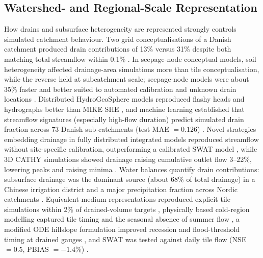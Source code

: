 \documentclass[11pt]{article}
\begin{document}
\subsection{Watershed- and Regional-Scale Representation}

How drains and subsurface heterogeneity are represented strongly controls simulated catchment behaviour. Two grid conceptualisations of a Danish catchment produced drain contributions of 13\% versus 31\% despite both matching total streamflow within 0.1\% \parencite{Karan2021}. In seepage-node conceptual models, soil heterogeneity affected drainage-area simulations more than tile conceptualisation, while the reverse held at subcatchment scale; seepage-node models were about 35\% faster and better suited to automated calibration and unknown drain locations \parencite{Boico2022}. Distributed HydroGeoSphere models reproduced flashy heads and hydrographs better than MIKE SHE \parencite{DeSchepper2017}, and machine learning established that streamflow signatures (especially high-flow duration) predict simulated drain fraction across 73 Danish sub-catchments (test MAE $=0.126$) \parencite{Schneider2022}. Novel strategies embedding drainage in fully distributed integrated models reproduced streamflow without site-specific calibration, outperforming a calibrated SWAT model \parencite{Rathore2024}, while 3D CATHY simulations showed drainage raising cumulative outlet flow 3--22\%, lowering peaks and raising minima \parencite{Muma2016}. Water balances quantify drain contributions: subsurface drainage was the dominant source (about 68\% of total drainage) in a Chinese irrigation district \parencite{Zheng2025b} and a major precipitation fraction across Nordic catchments \parencite{Nousiainen2015,Turunen2013}. Equivalent-medium representations reproduced explicit tile simulations within 2\% of drained-volume targets \parencite{Thomas2016}, physically based cold-region modelling captured tile timing and the seasonal absence of summer flow \parencite{Kompanizare2024}, a modified ODE hillslope formulation improved recession and flood-threshold timing at drained gauges \parencite{Fonley2021}, and SWAT was tested against daily tile flow (NSE $=0.5$, PBIAS $=-1.4$\%) \parencite{Rahman2014}.
\end{document}
